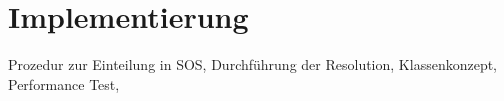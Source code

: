 
\chapter{Implementierung}

Prozedur zur Einteilung in SOS,
Durchführung der Resolution,
Klassenkonzept,
Performance Test,
